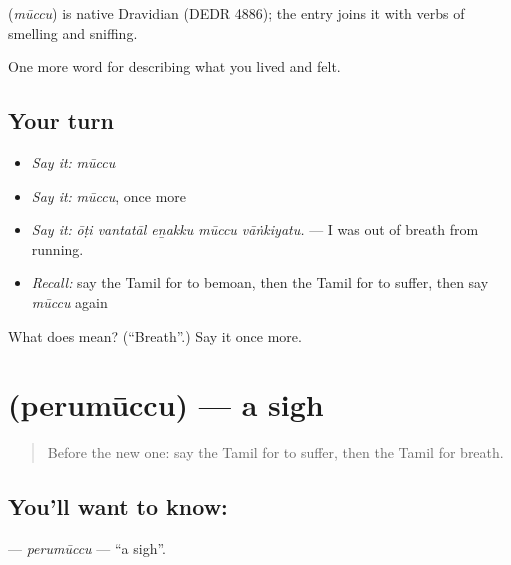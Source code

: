 \begin{cousinweb}
\textbf{} (\emph{mūccu}) is native Dravidian (DEDR 4886); the entry joins it with verbs of smelling and sniffing.
\end{cousinweb}

\begin{grammarlens}[title={What you've built}]
One more word for describing what you lived and felt.
\end{grammarlens}

\subsection*{Your turn}
\begin{itemize}
\raggedright
  \item \emph{Say it:} \emph{mūccu}
  \item \emph{Say it:} \emph{mūccu}, once more
  \item \emph{Say it:} \emph{ōṭi vantatāl eṉakku mūccu vāṅkiyatu.} — I was out of breath from running.
  \item \emph{Recall:} say the Tamil for to bemoan, then the Tamil for to suffer, then say \emph{mūccu} again
\end{itemize}

\begin{tcolorbox}[breakable,colback=teal!4,colframe=teal!35!black,title={Before you move on}]
What does  mean? (\textquotedblleft{}Breath\textquotedblright{}.) Say it once more.
\end{tcolorbox}
\section[\texorpdfstring{\ta{பெருமூச்சு} (perumūccu)}{பெருமூச்சு (perumūccu)}]{ (perumūccu) — a sigh}

\label{lesson:TA-C456-perumuccu}



\begin{quote}
Before the new one: say the Tamil for to suffer, then the Tamil for breath.
\end{quote}

\subsection*{You'll want to know: }
\textbf{} — \emph{perumūccu} — \textquotedblleft{}a sigh\textquotedblright{}.

